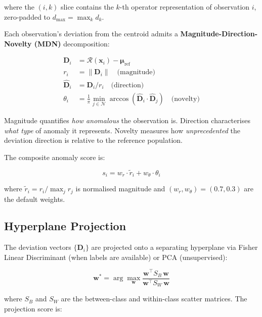 \documentclass[journal]{IEEEtran}
\newcommand{\N}{\mathcal{N}}
\newcommand{\calR}{\mathcal{R}}
\newcommand{\norm}[1]{\left\lVert#1\right\rVert}
\begin{document}
where the $(i,k)$ slice contains the $k$-th operator representation of observation $i$, zero-padded to $d_{\max} = \max_k d_k$.

Each observation's deviation from the centroid admits a \textbf{Magnitude-Direction-Novelty (MDN)} decomposition:

\begin{align}
\mathbf{D}_i &= \calR(\mathbf{x}_i) - \boldsymbol{\mu}_{\text{ref}} \label{eq:dev_vec} \\
r_i &= \norm{\mathbf{D}_i} \quad\text{(magnitude)} \label{eq:magnitude} \\
\hat{\mathbf{D}}_i &= \mathbf{D}_i / r_i \quad\text{(direction)} \label{eq:direction} \\
\theta_i &= \frac{1}{\pi}\min_{j \in \N} \arccos\!\left(\hat{\mathbf{D}}_i \cdot \hat{\mathbf{D}}_j\right) \quad\text{(novelty)} \label{eq:novelty}
\end{align}

Magnitude quantifies \textit{how anomalous} the observation is. Direction characterises \textit{what type} of anomaly it represents. Novelty measures how \textit{unprecedented} the deviation direction is relative to the reference population.

The composite anomaly score is:

\begin{equation}
s_i = w_r \cdot \tilde{r}_i + w_\theta \cdot \theta_i
\label{eq:score}
\end{equation}

where $\tilde{r}_i = r_i / \max_j r_j$ is normalised magnitude and $(w_r, w_\theta) = (0.7, 0.3)$ are the default weights.

\subsection{Hyperplane Projection}
\label{ssec:projection}

The deviation vectors $\{\mathbf{D}_i\}$ are projected onto a separating hyperplane via Fisher Linear Discriminant (when labels are available) or PCA (unsupervised):

\begin{equation}
\mathbf{w}^* = \arg\max_{\mathbf{w}} \frac{\mathbf{w}^\top S_B\, \mathbf{w}}{\mathbf{w}^\top S_W\, \mathbf{w}}
\label{eq:fisher}
\end{equation}

where $S_B$ and $S_W$ are the between-class and within-class scatter matrices. The projection score is:
\end{document}

